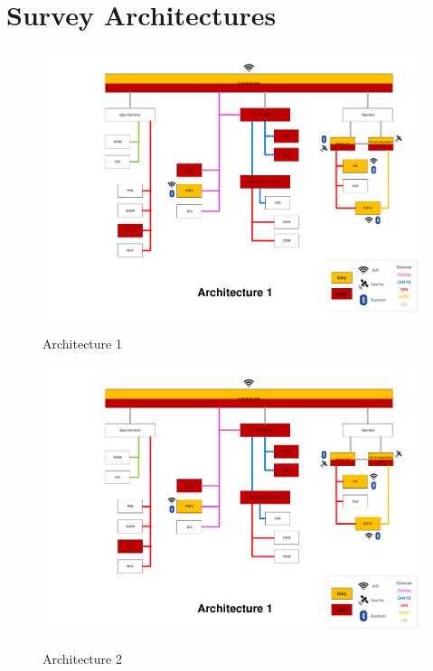 \chapter{Survey Architectures}
\label{fig:surveyarch}

\begin{figure}[h]
    \centering
    \caption{Architecture 1}
    \includegraphics[width=\textwidth, page=1]{../Architectures-survey.pdf}
    \label{fig:architecture1}
\end{figure}

\begin{figure}[h]
    \centering
    \caption{Architecture 2}
    \includegraphics[width=\textwidth, page=2]{../Architectures-survey.pdf}
    \label{fig:architecture2}
\end{figure}

